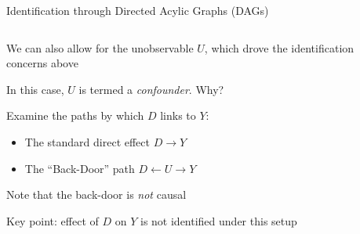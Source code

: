 \documentclass[notes,11pt, aspectratio=169]{beamer}
\newenvironment{wideitemize}{\itemize\addtolength{\itemsep}{10pt}}{\enditemize}
\begin{document}
\begin{frame}{Identification through Directed Acylic Graphs (DAGs)}
\begin{columns}[T] %
  \begin{column}{.5\textwidth}
    \begin{wideitemize}
    \item We can also allow for the unobservable $U$, which drove the identification concerns above
    \item In this case, $U$ is termed a \emph{confounder}. Why?
    \item Examine the paths by which $D$ links to $Y$:
      \begin{itemize}
      \item The standard direct effect $D \rightarrow Y$
      \item The ``Back-Door'' path $D \leftarrow U \rightarrow Y$
      \end{itemize}
    \item Note that the back-door is \emph{not} causal
    \item Key point: effect of $D$ on $Y$ is not identified under this setup
    \end{wideitemize}
  \end{column}%
  \hfill%
  \begin{column}{.5\textwidth}
    \begin{center}
    \end{center}
  \end{column}
\end{columns}
\end{frame}
\end{document}
